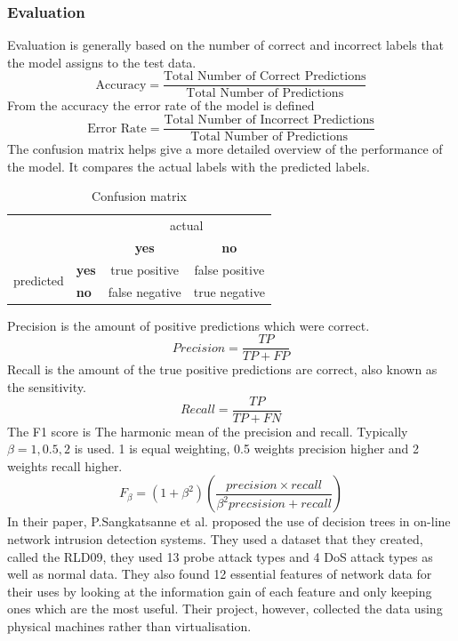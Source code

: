 \subsubsection{Evaluation}
Evaluation is generally based on the number of correct and incorrect labels that the model assigns to the test data. 
\begin{equation}\label{eq:acc}
 \text{Accuracy} = \frac{\text{Total Number of Correct Predictions}}{\text{Total Number of Predictions}}
\end{equation}
From the accuracy the error rate of the model is defined
\begin{equation}
 \text{Error Rate} = \frac{\text{Total Number of Incorrect Predictions}}{\text{Total Number of Predictions}}
\end{equation}
The confusion matrix helps give a more detailed overview of the performance of the model. It compares the actual labels with the predicted labels.
\begin{table}[H]
 \centering
 \caption{Confusion matrix}
 \begin{tabular}{ll|cc}
 &&\multicolumn{2}{c}{actual} \\
 &&\textbf{yes}&\textbf{no} \\
 \hline
 \multirow{2}{4em}{predicted}&\textbf{yes}& true positive & false positive\\
 &\textbf{no}& false negative & true negative\\
 \hline
\end{tabular}
\end{table}
Precision is the amount of positive predictions which were correct.
\begin{equation}\label{eq:precision}
 Precision = \frac{TP}{TP+FP}
\end{equation}
Recall is the amount of the true positive predictions are correct, also known as the sensitivity.
\begin{equation}\label{eq:rec}
 Recall = \frac{TP}{TP+FN}
\end{equation}
The F1 score is The harmonic mean of the precision and recall. Typically $\beta=1,0.5,2$ is used. 1 is equal weighting, 0.5 weights precision higher and 2 weights recall higher.
\begin{equation}
 F_\beta = (1+\beta^2)\left(\frac{precision \times recall}{\beta^2precsision + recall}\right)
\end{equation}
In their paper, P.Sangkatsanne et al. \cite{SANGKATSANEE20112227} proposed the use of decision trees in on-line network intrusion detection systems. They used a dataset that they created, called the RLD09, they used 13 probe attack types and 4 DoS attack types as well as normal data. They also found 12 essential features of network data for their uses by looking at the information gain of each feature and only keeping ones which are the most useful. Their project, however, collected the data using physical machines rather than virtualisation.

